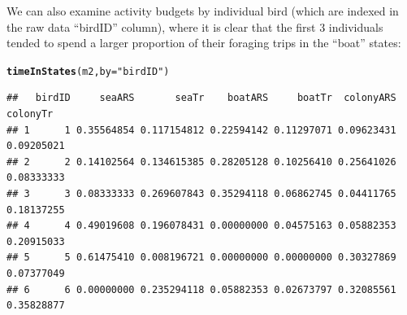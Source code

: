 \documentclass[12pt]{article}\usepackage[]{graphicx}\usepackage[]{xcolor}
\makeatletter
\newcommand{\hlstr}[1]{\textcolor[rgb]{0.192,0.494,0.8}{#1}}%
\newcommand{\hlstd}[1]{\textcolor[rgb]{0.345,0.345,0.345}{#1}}%
\newcommand{\hlkwc}[1]{\textcolor[rgb]{0.333,0.667,0.333}{#1}}%
\newcommand{\hlkwd}[1]{\textcolor[rgb]{0.737,0.353,0.396}{\textbf{#1}}}%
\newenvironment{kframe}{%
 \def\at@end@of@kframe{}%
 \ifinner\ifhmode%
  \def\at@end@of@kframe{\end{minipage}}%
  \begin{minipage}{\columnwidth}%
 \fi\fi%
 \def\FrameCommand##1{\hskip\@totalleftmargin \hskip-\fboxsep
 \colorbox{shadecolor}{##1}\hskip-\fboxsep
     \hskip-\linewidth \hskip-\@totalleftmargin \hskip\columnwidth}%
 \MakeFramed {\advance\hsize-\width
   \@totalleftmargin\z@ \linewidth\hsize
   \@setminipage}}%
 {\par\unskip\endMakeFramed%
 \at@end@of@kframe}
\newenvironment{knitrout}{}{} %
\makeatother
\begin{document}
We can also examine activity budgets by individual bird (which are indexed in the raw data ``birdID'' column), where it is clear that the first 3 individuals tended to spend a larger proportion of their foraging trips in the ``boat'' states:
\begin{knitrout}
\color{fgcolor}\begin{kframe}
\begin{alltt}
\hlkwd{timeInStates}\hlstd{(m2,} \hlkwc{by} \hlstd{=} \hlstr{"birdID"}\hlstd{)}
\end{alltt}
\end{kframe}
\end{knitrout}
\begin{knitrout}
\color{fgcolor}\begin{kframe}
\begin{verbatim}
##   birdID     seaARS       seaTr    boatARS     boatTr  colonyARS   colonyTr
## 1      1 0.35564854 0.117154812 0.22594142 0.11297071 0.09623431 0.09205021
## 2      2 0.14102564 0.134615385 0.28205128 0.10256410 0.25641026 0.08333333
## 3      3 0.08333333 0.269607843 0.35294118 0.06862745 0.04411765 0.18137255
## 4      4 0.49019608 0.196078431 0.00000000 0.04575163 0.05882353 0.20915033
## 5      5 0.61475410 0.008196721 0.00000000 0.00000000 0.30327869 0.07377049
## 6      6 0.00000000 0.235294118 0.05882353 0.02673797 0.32085561 0.35828877
\end{verbatim}
\end{kframe}
\end{knitrout}
\end{document}
